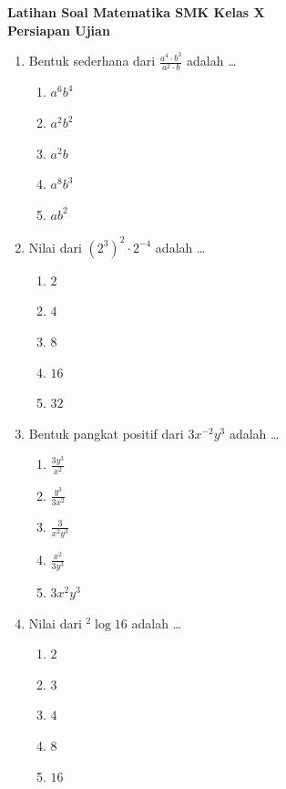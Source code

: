 \documentclass[12pt,a4paper]{article}
\begin{document}
\begin{center}
    \textbf{\Large Latihan Soal Matematika SMK Kelas X} \\
    \textbf{Persiapan Ujian}
\end{center}
\vspace{0.5cm}

\begin{enumerate}[leftmargin=*]

\item Bentuk sederhana dari $\frac{a^4 \cdot b^3}{a^2 \cdot b}$ adalah \dots
    \begin{enumerate}[label=\alph*.]
        \item $a^6 b^4$
        \item $a^2 b^2$
        \item $a^2 b$
        \item $a^8 b^3$
        \item $a b^2$
    \end{enumerate}

\item Nilai dari $(2^3)^2 \cdot 2^{-4}$ adalah \dots
    \begin{enumerate}[label=\alph*.]
        \item $2$
        \item $4$
        \item $8$
        \item $16$
        \item $32$
    \end{enumerate}

\item Bentuk pangkat positif dari $3x^{-2}y^3$ adalah \dots
    \begin{enumerate}[label=\alph*.]
        \item $\frac{3y^3}{x^2}$
        \item $\frac{y^3}{3x^2}$
        \item $\frac{3}{x^2 y^3}$
        \item $\frac{x^2}{3y^3}$
        \item $3x^2 y^3$
    \end{enumerate}

\item Nilai dari $^2\log 16$ adalah \dots
    \begin{enumerate}[label=\alph*.]
        \item $2$
        \item $3$
        \item $4$
        \item $8$
        \item $16$
    \end{enumerate}


\end{enumerate}
\end{document}
